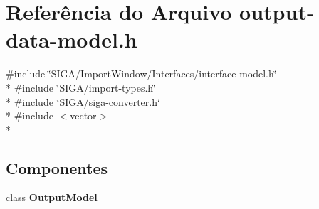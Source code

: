 \section{Referência do Arquivo output-\/data-\/model.h}
\label{output-data-model_8h}
{\ttfamily \#include \char`\"{}S\+I\+G\+A/\+Import\+Window/\+Interfaces/interface-\/model.\+h\char`\"{}}\\*
{\ttfamily \#include \char`\"{}S\+I\+G\+A/import-\/types.\+h\char`\"{}}\\*
{\ttfamily \#include \char`\"{}S\+I\+G\+A/siga-\/converter.\+h\char`\"{}}\\*
{\ttfamily \#include $<$vector$>$}\\*
\subsection*{Componentes}
\begin{DoxyCompactItemize}
\item 
class {\bf Output\+Model}
\end{DoxyCompactItemize}
